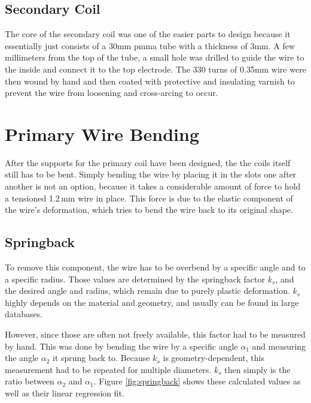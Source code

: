 \subsection{Secondary Coil}

The core of the secondary coil was one of the easier parts to design because it essentially just consists of a 30mm \gls{pmma} tube with a thickness of 3mm. A few millimeters from the top of the tube, a small hole was drilled to guide the wire to the inside and connect it to the top electrode. The 330 turns of 0.35mm wire were then wound by hand and then coated with protective and insulating varnish to prevent the wire from loosening and cross-arcing to occur.


\section{Primary Wire Bending}

After the supports for the primary coil have been designed, the the coils itself still has to be bent. Simply bending the wire by placing it in the slots one after another is not an option, because it takes a considerable amount of force to hold a tensioned 1.2\,mm wire in place. 
This force is due to the elastic component of the wire's deformation, which tries to bend the wire back to its original shape. 

\subsection{Springback}

To remove this component, the wire has to be overbend by a specific angle and to a specific radius. Those values are determined by the springback factor \(k_s\), and the desired angle and radius, which remain due to purely plastic deformation. \(k_s\) highly depends on the material and geometry, and usually can be found in large databases.

However, since those are often not freely available, this factor had to be measured by hand. This was done by bending the wire by a specific angle \(\alpha_1\) and measuring the angle \(\alpha_2\) it sprung back to. Because \(k_s\) is geometry-dependent, this measurement had to be repeated for multiple diameters. \(k_s\) then simply is the ratio between \(\alpha_2\) and \(\alpha_1\). Figure \ref{fig:springback} shows these calculated values as well as their linear regression fit.


